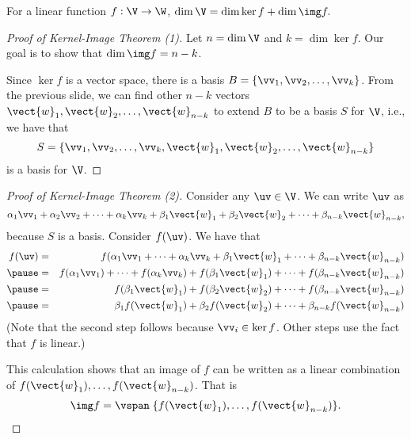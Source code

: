 \begin{frame}
\begin{theorem}
  For a linear function $f:\V\rightarrow\W$,
  $\dim \V = \dim\ker f + \dim\img f.$
\end{theorem}

\begin{proof}[Proof of Kernel-Image Theorem (1)]
  \pause
  Let $n=\dim\V$ and $k=\dim\ker f$.  Our goal is to show that
  $\dim\img f=n-k$.

  \pause
  Since $\ker f$ is a vector space, there is a basis
  $B=\{\vv_1,\vv_2,\ldots,\vv_k\}$.
  \pause
  From the previous slide, we can
  find other $n-k$ vectors
  $\vect{w}_1,\vect{w}_2,\ldots,\vect{w}_{n-k}$ to extend $B$ to be a
  basis $S$ for $\V$, i.e., we have that
  \[
  S =
  \{\vv_1,\vv_2,\ldots,\vv_k,\vect{w}_1,\vect{w}_2,\ldots,\vect{w}_{n-k}\}
  \]
  is a basis for $\V$.
\end{proof}
\end{frame}

\begin{frame}
  \begin{proof}[Proof of Kernel-Image Theorem (2)]
    \pause
  Consider any $\uv\in\V$.  We can write $\uv$ as
  \[
  \alpha_1\vv_1 + \alpha_2\vv_2 + \cdots + \alpha_k\vv_k +
  \beta_1\vect{w}_1 + \beta_2\vect{w}_2 + \cdots +
  \beta_{n-k}\vect{w}_{n-k},
  \]
  because $S$ is a basis.
  \pause
  Consider $f(\uv)$.  We have that
  \begin{eqnarray*}
  f(\uv) & = & 
  f(\alpha_1\vv_1 + \cdots + \alpha_k\vv_k +
  \beta_1\vect{w}_1 + \cdots +
  \beta_{n-k}\vect{w}_{n-k}) \\
  \pause
  & = & 
  f(\alpha_1\vv_1) + \cdots + f(\alpha_k\vv_k) +
  f(\beta_1\vect{w}_1) + \cdots +
  f(\beta_{n-k}\vect{w}_{n-k}) \\
  \pause
  & = & 
  f(\beta_1\vect{w}_1) + f(\beta_2\vect{w}_2) + \cdots +
  f(\beta_{n-k}\vect{w}_{n-k}) \\
  \pause
  & = & 
  \beta_1f(\vect{w}_1) + \beta_2f(\vect{w}_2) + \cdots +
  \beta_{n-k}f(\vect{w}_{n-k})
  \end{eqnarray*}
  {\tiny (Note that the second step follows because $\vv_i\in\ker f$.  Other
  steps use the fact that $f$ is linear.)}

  This calculation shows that \pause an image of $f$ can be written as a
  linear combination of $f(\vect{w}_1),\ldots,f(\vect{w}_{n-k})$.
  That is
  \[
  \img f = \vspan\; \{f(\vect{w}_1),\ldots,f(\vect{w}_{n-k})\}.
  \]
  \end{proof}
\end{frame}

